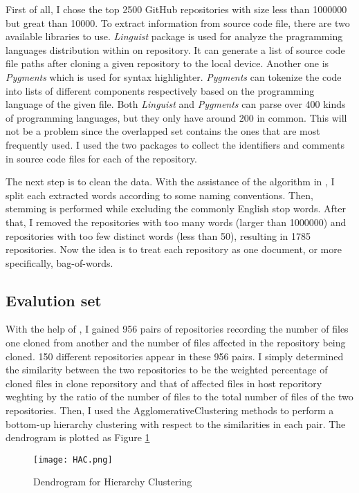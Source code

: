 First of all, I chose the top 2500 GitHub repositories with size less
than 1000000 but great than 10000. To extract information from source
code file, there are two available libraries to use. \emph{Linguist}
package is used for analyze the pragramming languages distribution
within on repository. It can generate a list of source code file paths
after cloning a given repository to the local device. Another one is
\emph{Pygments} which is used for syntax highlighter. \emph{Pygments}
can tokenize the code into lists of different components respectively
based on the programming language of the given file. Both
\emph{Linguist} and \emph{Pygments} can parse over 400 kinds of
programming languages, but they only have around 200 in common. This
will not be a problem since the overlapped set contains the ones that
are most frequently used. I used the two packages to collect the
identifiers and comments in source code files for each of the
repository.

The next step is to clean the data. With the assistance of the algorithm
in \citet{Markovtsev:2017aa}, I split each extracted words according to
some naming conventions. Then, stemming is performed while excluding the
commonly English stop words. After that, I removed the repositories with
too many words (larger than 1000000) and repositories with too few
distinct words (less than 50), resulting in 1785 repositories. Now the
idea is to treat each repository as one document, or more specifically,
bag-of-words.

\hypertarget{evalution-set}{%
\subsection{Evalution set}\label{evalution-set}}

With the help of \citet{lopes2017dejavu}, I gained 956 pairs of
repositories recording the number of files one cloned from another and
the number of files affected in the repository being cloned. 150
different repositories appear in these 956 pairs. I simply determined
the similarity between the two repositories to be the weighted
percentage of cloned files in clone reporsitory and that of affected
files in host reporitory weghting by the ratio of the number of files to
the total number of files of the two repositories. Then, I used the
AgglomerativeClustering methods to perform a bottom-up hierarchy
clustering with respect to the similarities in each pair. The dendrogram
is plotted as Figure \ref{figure:hac}

\begin{figure}[h]
  \centering
  \texttt{[image: HAC.png]}
  \caption{Dendrogram for Hierarchy Clustering}
  \label{figure:hac}
\end{figure}

